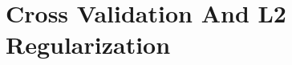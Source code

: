 \documentclass{article}
\begin{document}
\section{Cross Validation And L2 Regularization}



\end{document}
